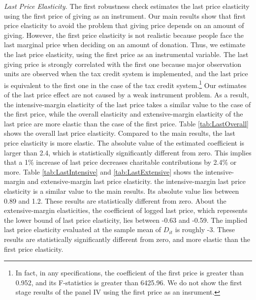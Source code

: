 \documentclass[
  11pt,
  a4paper,
]{article}
\begin{document}
\emph{Last Price Elasticity.}
The first robustness check estimates the last price elasticity using the first price of giving as an instrument.
Our main results show that first price elasticity to avoid the problem that giving price depends on an amount of giving.
However, the first price elasticity is not realistic because people face the last marginal price when deciding on an amount of donation.
Thus, we estimate the last price elasticity, using the first price as an instrumental variable.
The last giving price is strongly correlated with the first one because
major observation units are observed when the tax credit system is implemented,
and the last price is equivalent to the first one in the case of the tax credit system.\footnote{In fact, in any specifications, the coefficient of the first price is greater than 0.952, and its F-statistics is greater than 6425.96. We do not show the first stage results of the panel IV using the first price as an insrument.}
Our estimates of the last price effect are not caused by a weak instrument problem.
As a result, the intensive-margin elasticity of the last price takes a similar value to the case of the first price, while
the overall elasticity and extensive-margin elasticity of the last price are more elastic than the case of the first price.
Table \ref{tab:LastOverall} shows the overall last price elasticity.
Compared to the main results, the last price elasticity is more elastic.
The absolute value of the estimated coefficient is larger than 2.4,
which is statistically significantly different from zero.
This implies that a 1\% increase of last price decreases charitable contributions by 2.4\% or more.
Table \ref{tab:LastIntensive} and \ref{tab:LastExtensive} shows
the intensive-margin and extensive-margin last price elasticity.
the intensive-margin last price elasticity is a similar value to the main results.
Its absolute value lies between 0.89 and 1.2.
These results are statistically different from zero.
About the extensive-margin elasticities,
the coefficient of logged last price, which represents the lower bound of last price elasticity,
lies between -0.63 and -0.59.
The implied last price elasticity evaluated at the sample mean of \(D_{it}\) is roughly -3.
These results are statistically significantly different from zero, and more elastic than the first price elasticity.
\end{document}
